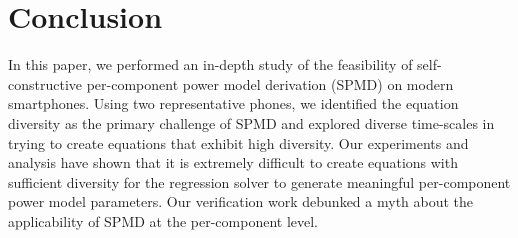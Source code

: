 \section{Conclusion}
\label{sec:conc}

In this paper, we performed an in-depth study of the feasibility of self-constructive per-component power model
derivation (SPMD) on modern smartphones. Using two representative phones,
we identified the equation diversity as the primary challenge of SPMD
and explored diverse time-scales in trying to create equations that exhibit high diversity.  
Our experiments and analysis have shown that it is extremely difficult to create equations with sufficient diversity for the regression solver to generate meaningful per-component power model parameters. 
Our verification work debunked a myth about the applicability of SPMD at the per-component level.